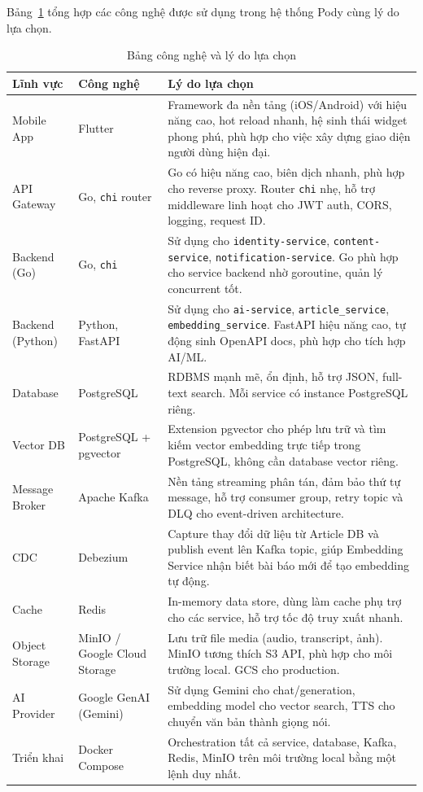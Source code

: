\documentclass[14pt,a4paper,oneside]{extreport}
\begin{document}
Bảng~\ref{tab:cong-nghe} tổng hợp các công nghệ được sử dụng trong hệ thống Pody cùng lý do lựa chọn.

\begin{table}[H]
\centering
\caption{Bảng công nghệ và lý do lựa chọn}
\label{tab:cong-nghe}
\renewcommand{\arraystretch}{1.3}
\small
\begin{tabularx}{\textwidth}{|l|l|X|}
\hline
\textbf{Lĩnh vực} & \textbf{Công nghệ} & \textbf{Lý do lựa chọn} \\
\hline
Mobile App & Flutter &
  Framework đa nền tảng (iOS/Android) với hiệu năng cao, hot reload nhanh, hệ sinh thái widget phong phú, phù hợp cho việc xây dựng giao diện người dùng hiện đại. \\
\hline
API Gateway & Go, \texttt{chi} router &
  Go có hiệu năng cao, biên dịch nhanh, phù hợp cho reverse proxy. Router \texttt{chi} nhẹ, hỗ trợ middleware linh hoạt cho JWT auth, CORS, logging, request ID. \\
\hline
Backend (Go) & Go, \texttt{chi} &
  Sử dụng cho \texttt{identity-service}, \texttt{content-service}, \texttt{notification-service}. Go phù hợp cho service backend nhờ goroutine, quản lý concurrent tốt. \\
\hline
Backend (Python) & Python, FastAPI &
  Sử dụng cho \texttt{ai-service}, \texttt{article\_service}, \texttt{embedding\_service}. FastAPI hiệu năng cao, tự động sinh OpenAPI docs, phù hợp cho tích hợp AI/ML. \\
\hline
Database & PostgreSQL &
  RDBMS mạnh mẽ, ổn định, hỗ trợ JSON, full-text search. Mỗi service có instance PostgreSQL riêng. \\
\hline
Vector DB & PostgreSQL + pgvector &
  Extension pgvector cho phép lưu trữ và tìm kiếm vector embedding trực tiếp trong PostgreSQL, không cần database vector riêng. \\
\hline
Message Broker & Apache Kafka &
  Nền tảng streaming phân tán, đảm bảo thứ tự message, hỗ trợ consumer group, retry topic và DLQ cho event-driven architecture. \\
\hline
CDC & Debezium &
  Capture thay đổi dữ liệu từ Article DB và publish event lên Kafka topic, giúp Embedding Service nhận biết bài báo mới để tạo embedding tự động. \\
\hline
Cache & Redis &
  In-memory data store, dùng làm cache phụ trợ cho các service, hỗ trợ tốc độ truy xuất nhanh. \\
\hline
Object Storage & MinIO / Google Cloud Storage &
  Lưu trữ file media (audio, transcript, ảnh). MinIO tương thích S3 API, phù hợp cho môi trường local. GCS cho production. \\
\hline
AI Provider & Google GenAI (Gemini) &
  Sử dụng Gemini cho chat/generation, embedding model cho vector search, TTS cho chuyển văn bản thành giọng nói. \\
\hline
Triển khai & Docker Compose &
  Orchestration tất cả service, database, Kafka, Redis, MinIO trên môi trường local bằng một lệnh duy nhất. \\
\hline
\end{tabularx}
\end{table}
\end{document}
